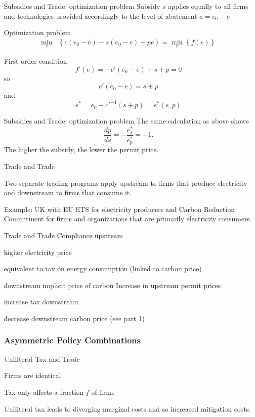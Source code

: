 
{Subsidies and Trade: optimization problem}
Subsidy $s$ applies equally to all firms and technologies provided accordingly to the level of abatement $a = e_0 - e$ \\
\item <1-> Optimization problem
\begin{align}
\min_{e} & \left\{c(e_0-e)-s(e_0-e)+pe\right\} = \min_{e}\left\{f(e)\right\}
\end{align}
\item <2-> First-order-condition
\[
f'(e)=-c'(e_0-e)+ s+p = 0
\]
so
\[
c'(e_0-e)=s+p
\]
and
\[
e^*=e_0-c'^{-1}(s+p)=e^*(s,p)
\]


{Subsidies and Trade: optimization problem}
The same calculation as above shows
\[
\frac{dp}{ds} = -\frac{e^*_s}{e^*_p}=-1.
\]
The higher the subsidy, the lower the permit price.

{Trade and Trade}
\item<1-> Two separate trading programs apply upstream to firms that produce electricity and downstream to firms that consume it.
\item<2-> Example: UK with EU ETS for electricity producers and Carbon Reduction Commitment for firms and organizations that are primarily electricity consumers.

{Trade and Trade}
Compliance upstream
\item <1-> higher electricity price
\item <2-> equivalent to tax on energy consumption (linked to carbon price)
\item <3-> downstream implicit price of carbon
Increase in upstream permit prices
\item <1-> increase tax downstream
\item <2-> decrease downstream carbon price (see part 1)

\subsubsection{Asymmetric Policy Combinations}

{Uniliteral Tax and Trade}
\item<1-> Firms are identical
\item<2-> Tax only affects a fraction $f$ of firms
\item<3-> Uniliteral tax leads to diverging marginal costs and so increased mitigation costs.


